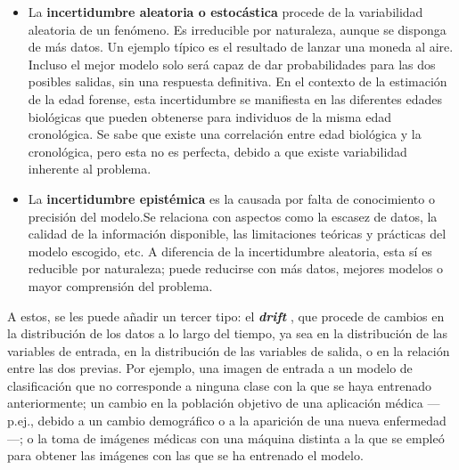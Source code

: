\begin{itemize}
    
    \item La \textbf{incertidumbre aleatoria o estocástica} procede de la variabilidad aleatoria de un 
    fenómeno. Es irreducible por naturaleza, aunque se disponga de más datos. Un ejemplo típico es el resultado de lanzar una moneda al aire. Incluso el mejor modelo solo será capaz de dar probabilidades para las dos posibles salidas, sin una respuesta definitiva. En el contexto de la estimación de la edad forense, esta incertidumbre se manifiesta en las diferentes edades biológicas que pueden obtenerse para individuos de la misma edad cronológica. Se sabe que existe una correlación entre edad biológica y la cronológica, pero esta no es perfecta, debido a que existe variabilidad inherente al problema.

        
        
    


    \item La \textbf{incertidumbre epistémica} es la causada por falta de conocimiento o precisión del modelo.Se relaciona con aspectos como la escasez de datos, la calidad de la información disponible, las limitaciones teóricas y prácticas del modelo escogido, etc. A diferencia de la incertidumbre aleatoria, esta sí es reducible por naturaleza; puede reducirse con más datos, mejores modelos o mayor comprensión del problema. 
    
\end{itemize}

A estos, se les puede añadir un tercer tipo: el \textbf{\textit{drift}} \cite{gama2012, nemani2023}, que procede de cambios en la distribución de los datos a lo largo del tiempo, ya sea en la distribución de las variables de entrada, en la distribución de las variables de salida, o en la relación entre las dos previas. Por ejemplo, una imagen de entrada a un modelo de clasificación que no corresponde a ninguna clase con la que se haya entrenado anteriormente; un cambio en la población objetivo de una aplicación médica ---p.ej., debido a un cambio demográfico o a la aparición de una nueva enfermedad---; o la toma de imágenes médicas con una máquina distinta a la que se empleó para obtener las imágenes con las que se ha entrenado el modelo.

